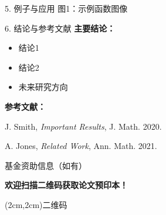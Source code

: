 \documentclass[a0paper,portrait]{baposter}
\begin{document}
\begin{poster}
{\begin{posterbox}{5. 例子与应用}
        图1：示例函数图像
    \end{posterbox}

    \begin{posterbox}{6. 结论与参考文献}
        \textbf{主要结论：}
        \begin{itemize}
            \item 结论1
            \item 结论2
            \item 未来研究方向
        \end{itemize}

        \vspace{0.5em}

        \textbf{参考文献：}

        \begin{enumerate}[{[1]}]
            \item J. Smith, \textit{Important Results}, J. Math. 2020.
            \item A. Jones, \textit{Related Work}, Ann. Math. 2021.
            \item 基金资助信息（如有）
        \end{enumerate}

        \vspace{1em}

        \begin{center}
        \textbf{欢迎扫描二维码获取论文预印本！}

        \vspace{0.5em}

        \framebox(2cm,2cm){二维码}
        \end{center}
    \end{posterbox}
}

\end{poster}
\end{document}
